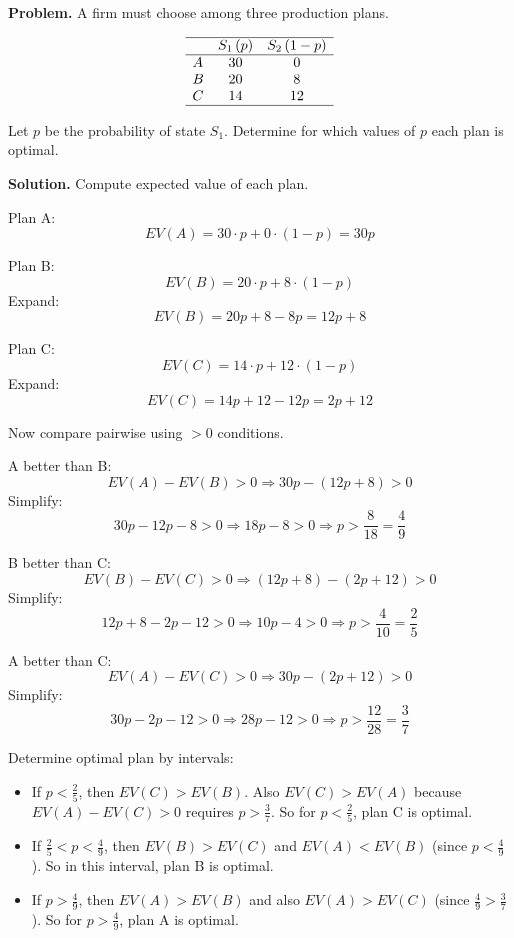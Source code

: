 \begin{ExamProblems}
		\textbf{Problem.}
		A firm must choose among three production plans.
		
		\[
		\begin{array}{lcc}
			\hline
			& S_1\,(p) & S_2\,(1-p) \\
			\hline
			A & 30 & 0 \\
			B & 20 & 8 \\
			C & 14 & 12 \\
			\hline
		\end{array}
		\]
		
		Let \(p\) be the probability of state \(S_1\).  
		Determine for which values of \(p\) each plan is optimal.
		
		\textbf{Solution.}
		Compute expected value of each plan.
		
		Plan A:
		\[
		EV(A)=30\cdot p + 0\cdot(1-p)=30p
		\]
		
		Plan B:
		\[
		EV(B)=20\cdot p + 8\cdot(1-p)
		\]
		Expand:
		\[
		EV(B)=20p + 8 - 8p = 12p+8
		\]
		
		Plan C:
		\[
		EV(C)=14\cdot p + 12\cdot(1-p)
		\]
		Expand:
		\[
		EV(C)=14p + 12 - 12p = 2p+12
		\]
		
		Now compare pairwise using \(>0\) conditions.
		
		A better than B:
		\[
		EV(A)-EV(B)>0 \Rightarrow 30p-(12p+8)>0
		\]
		Simplify:
		\[
		30p-12p-8>0 \Rightarrow 18p-8>0 \Rightarrow p>\frac{8}{18}=\frac{4}{9}
		\]
		
		B better than C:
		\[
		EV(B)-EV(C)>0 \Rightarrow (12p+8)-(2p+12)>0
		\]
		Simplify:
		\[
		12p+8-2p-12>0 \Rightarrow 10p-4>0 \Rightarrow p>\frac{4}{10}=\frac{2}{5}
		\]
		
		A better than C:
		\[
		EV(A)-EV(C)>0 \Rightarrow 30p-(2p+12)>0
		\]
		Simplify:
		\[
		30p-2p-12>0 \Rightarrow 28p-12>0 \Rightarrow p>\frac{12}{28}=\frac{3}{7}
		\]
		
		Determine optimal plan by intervals:
		\begin{itemize}
			\item If \(p<\frac{2}{5}\), then \(EV(C)>EV(B)\). Also \(EV(C)>EV(A)\) because \(EV(A)-EV(C)>0\) requires \(p>\frac{3}{7}\). So for \(p<\frac{2}{5}\), plan C is optimal.
			\item If \(\frac{2}{5}<p<\frac{4}{9}\), then \(EV(B)>EV(C)\) and \(EV(A)<EV(B)\) (since \(p<\frac{4}{9}\)). So in this interval, plan B is optimal.
			\item If \(p>\frac{4}{9}\), then \(EV(A)>EV(B)\) and also \(EV(A)>EV(C)\) (since \(\frac{4}{9}>\frac{3}{7}\)). So for \(p>\frac{4}{9}\), plan A is optimal.
		\end{itemize}
		

\end{ExamProblems}
